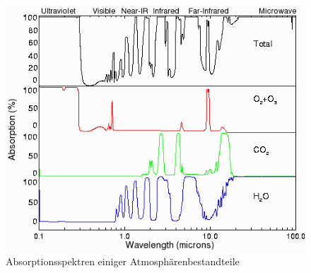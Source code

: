 \documentclass[]{article}
\begin{document}
		\begin{figure}[!h]
			\centering
			\includegraphics[scale=0.5]{images/Absorptionsspektrum}
			\caption{Absorptionsspektren einiger Atmosphärenbestandteile\cite{atmosphaere}}
			\label{img:absorptionsspektrum}
		\end{figure}
		\clearpage
\end{document}
